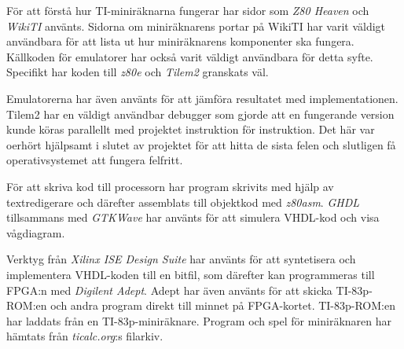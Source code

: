 \documentclass[main.tex]{subfiles}
\begin{document}
För att förstå hur TI-miniräknarna fungerar har sidor som {\it Z80
Heaven}\cite{z80heaven} och {\it WikiTI}\cite{wikiti} använts. Sidorna om
miniräknarens portar på WikiTI har varit väldigt användbara för att lista ut
hur miniräknarens komponenter ska fungera. Källkoden för emulatorer har också
varit väldigt användbara för detta syfte. Specifikt har koden till {\it
z80e}\cite{z80e} och {\it Tilem2}\cite{tilem2} granskats väl.

Emulatorerna har även använts för att jämföra resultatet med implementationen.
Tilem2 har en väldigt användbar debugger som gjorde att en fungerande version
kunde köras parallellt med projektet instruktion för instruktion. Det här var
oerhört hjälpsamt i slutet av projektet för att hitta de sista felen och
slutligen få operativsystemet att fungera felfritt.

För att skriva kod till processorn har program skrivits med hjälp av
textredigerare och därefter assemblats till objektkod med {\it
z80asm}\cite{z80asm}. {\it GHDL}\cite{ghdl} tillsammans med {\it
GTKWave}\cite{gtkwave} har använts för att simulera VHDL-kod och visa
vågdiagram.

Verktyg från {\it Xilinx ISE Design Suite} har använts för att syntetisera och
implementera VHDL-koden till en bitfil, som därefter kan programmeras till
FPGA:n med {\it Digilent Adept}. Adept har även använts för att skicka
TI-83p-ROM:en och andra program direkt till minnet på FPGA-kortet.
TI-83p-ROM:en har laddats från en TI-83p-miniräknare. Program och spel för
miniräknaren har hämtats från {\it ticalc.org}:s filarkiv\cite{ticalc}.
\end{document}
